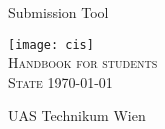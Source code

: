 %
%

\begin{titlepage}
\begin{center}
\vspace*{30mm} \Huge Submission Tool\\
\vspace*{10mm}

\vfill \texttt{[image: cis]}\\
\vspace*{20mm}
\textsc{\LARGE{Handbook for students}\\
\vspace*{5mm}
\large{State \today}}

	
\vfill \small{UAS Technikum Wien}\\

\end{center}
\end{titlepage}
